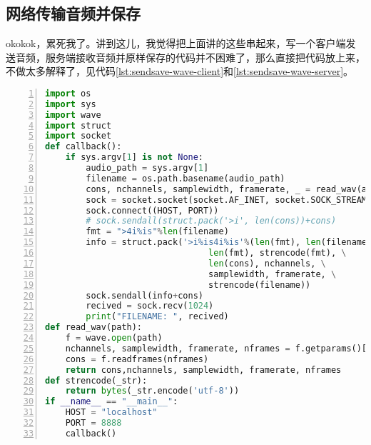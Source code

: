 \subsection{网络传输音频并保存} %
okokok，累死我了。讲到这儿，我觉得把上面讲的这些串起来，写一个客户端发送音频，服务端接收音频并原样保存的代码并不困难了，那么直接把代码放上来，不做太多解释了，见代码\ref{lst:sendsave-wave-client}和\ref{lst:sendsave-wave-server}。
\begin{lstlisting}[language = python, caption={音频传输的client端代码}, label={lst:sendsave-wave-client}, numbers=left, 
       numberstyle=\tiny,keywordstyle=\color{blue!70},
       commentstyle=\color{red!50!green!50!blue!50},frame=shadowbox,
       rulesepcolor=\color{red!20!green!20!blue!20},basicstyle=\ttfamily]
import os
import sys
import wave
import struct
import socket
def callback():
    if sys.argv[1] is not None:
        audio_path = sys.argv[1]
        filename = os.path.basename(audio_path)
        cons, nchannels, samplewidth, framerate, _ = read_wav(audio_path)
        sock = socket.socket(socket.AF_INET, socket.SOCK_STREAM)
        sock.connect((HOST, PORT))
        # sock.sendall(struct.pack('>i', len(cons))+cons)
        fmt = ">4i%is"%len(filename)
        info = struct.pack('>i%is4i%is'%(len(fmt), len(filename)),\
                                len(fmt), strencode(fmt), \
                                len(cons), nchannels, \
                                samplewidth, framerate, \
                                strencode(filename)) 
        sock.sendall(info+cons)
        recived = sock.recv(1024)
        print("FILENAME: ", recived)
def read_wav(path):
    f = wave.open(path)
    nchannels, samplewidth, framerate, nframes = f.getparams()[:4]
    cons = f.readframes(nframes)
    return cons,nchannels, samplewidth, framerate, nframes 
def strencode(_str):
    return bytes(_str.encode('utf-8'))
if __name__ == "__main__":
    HOST = "localhost"
    PORT = 8888
    callback()
\end{lstlisting}

